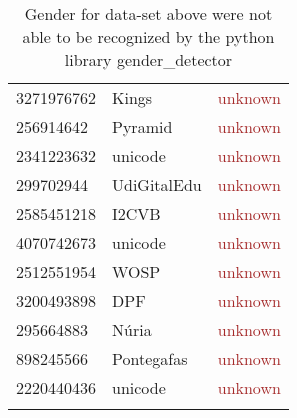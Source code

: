\begin{table}[!htbp]
\begin{center}
\begin{minipage}{0.4\textwidth}
\begin{tabular}{|l l l|}
			3271976762 & Kings & \textcolor{brown}{unknown}\\
			256914642 & Pyramid & \textcolor{brown}{unknown}\\
			2341223632 & unicode & \textcolor{brown}{unknown}\\
			299702944 & UdiGitalEdu & \textcolor{brown}{unknown}\\
			2585451218 & I2CVB & \textcolor{brown}{unknown}\\
			4070742673 & unicode & \textcolor{brown}{unknown}\\
			2512551954 & WOSP & \textcolor{brown}{unknown}\\
			3200493898 & DPF & \textcolor{brown}{unknown}\\
			295664883 & Núria & \textcolor{brown}{unknown}\\
			898245566 & Pontegafas & \textcolor{brown}{unknown}\\
			2220440436 & unicode & \textcolor{brown}{unknown}\\
			& & \\
			\hline
		\end{tabular}
	\end{minipage}	
	\caption*{\scriptsize Gender for data-set above were not able to be recognized by the python library gender\_detector}
	 \end{center}
\end{table}